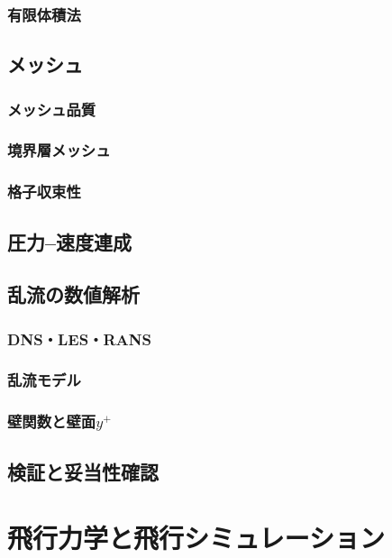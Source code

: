 \documentclass[uplatex,dvipdfmx,a4j,11pt]{jsreport}
\numberwithin{equation}{chapter}
\begin{document}
\subsection{有限体積法}

\section{メッシュ}

\subsection{メッシュ品質}

\subsection{境界層メッシュ}

\subsection{格子収束性}

\section{圧力--速度連成}

\section{乱流の数値解析}

\subsection{DNS・LES・RANS}

\subsection{乱流モデル}

\subsection{壁関数と壁面$y^+$}

\section{検証と妥当性確認}



\chapter{飛行力学と飛行シミュレーション}
\end{document}
